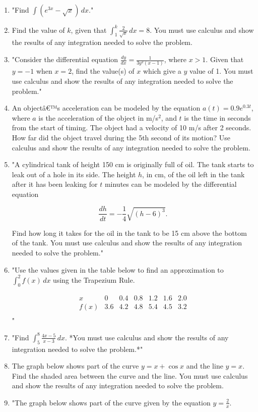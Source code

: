 \documentclass{article}
\begin{document}
\begin{enumerate}
\item "Find \(\int (e^{3x} - \sqrt{x}) \, dx\)."
\vspace{3cm}
\item Find the value of \( k \), given that \(\int_{1}^{k} \frac{2}{\sqrt{x}} \, dx = 8\). You must use calculus and show the results of any integration needed to solve the problem.
\vspace{3cm}
\item "Consider the differential equation \( \frac{dy}{dx} = \frac{1}{3y^2(x-1)} \), where \( x > 1 \). Given that \( y = -1 \) when \( x = 2 \), find the value(s) of \( x \) which give a \( y \) value of 1. You must use calculus and show the results of any integration needed to solve the problem."
\vspace{3cm}
\item An objectâ€™s acceleration can be modeled by the equation \( a(t) = 0.9e^{0.3t} \), where \( a \) is the acceleration of the object in m/s\(^2\), and \( t \) is the time in seconds from the start of timing. The object had a velocity of 10 m/s after 2 seconds. How far did the object travel during the 5th second of its motion? Use calculus and show the results of any integration needed to solve the problem.
\vspace{3cm}
\item "A cylindrical tank of height 150 cm is originally full of oil. The tank starts to leak out of a hole in its side. The height \( h \), in cm, of the oil left in the tank after it has been leaking for \( t \) minutes can be modeled by the differential equation

\[ 
\frac{dh}{dt} = -\frac{1}{4} \sqrt{(h-6)^3}. 
\]

Find how long it takes for the oil in the tank to be 15 cm above the bottom of the tank. You must use calculus and show the results of any integration needed to solve the problem."
\vspace{3cm}
\item "Use the values given in the table below to find an approximation to \(\int_0^2 f(x) \, dx\) using the Trapezium Rule.

\[
\begin{array}{c|cccccc}
x & 0 & 0.4 & 0.8 & 1.2 & 1.6 & 2.0 \\
\hline
f(x) & 3.6 & 4.2 & 4.8 & 5.4 & 4.5 & 3.2 \\
\end{array}
\]"
\vspace{3cm}
\item "Find \(\int_5^8 \frac{4x-5}{x-3} \, dx\). *You must use calculus and show the results of any integration needed to solve the problem.*"
\vspace{3cm}
\item The graph below shows part of the curve \( y = x + \cos x \) and the line \( y = x \). Find the shaded area between the curve and the line. You must use calculus and show the results of any integration needed to solve the problem.
\vspace{3cm}
\item "The graph below shows part of the curve given by the equation \( y = \frac{2}{x} \).


\end{enumerate}
\end{document}
